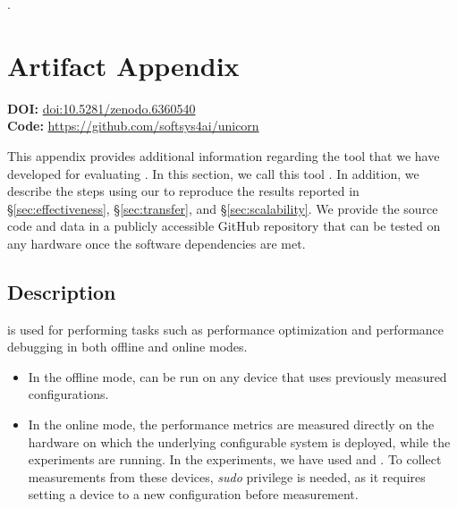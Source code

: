 .%
%


\section{Artifact Appendix}
\label{sec:artifact}
\begin{tcolorbox}[colback=blue!5!white,colframe=blue!75!black]
\textbf{DOI:} \url{doi:10.5281/zenodo.6360540} \\
\textbf{Code:} \url{https://github.com/softsys4ai/unicorn}
\end{tcolorbox}

This appendix provides additional information regarding the tool that we have developed for evaluating \ourapproach. In this section, we call this tool \ourtool. In addition, we describe the steps using our \ourtool to reproduce the results reported in \S\ref{sec:effectiveness}, \S\ref{sec:transfer}, and \S\ref{sec:scalability}. We provide the source code and data in a publicly accessible GitHub repository that can be tested on any hardware once the software dependencies are met. 

\subsection{Description}
\ourapproach is used for performing tasks such as performance optimization and performance debugging in both offline and online modes. 
\begin{itemize}
    \item In the offline mode, \ourtool can be run on any device that uses previously measured configurations.
    \item In the online mode, the performance metrics are measured directly on the hardware on which the underlying configurable system is deployed, while the experiments are running. In the experiments, we have used \txtwo and \xavier. To collect measurements from these devices, \emph{sudo} privilege is needed, as it requires setting a device to a new configuration before measurement.
\end{itemize}
 
